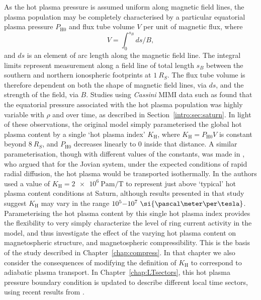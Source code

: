 As the hot plasma pressure is assumed uniform along magnetic field lines, the plasma population may be completely characterised by a particular equatorial plasma pressure $P_\mathrm{H0}$ and flux tube volume $V$ per unit of magnetic flux, where
\begin{equation}\label{intro:eq:ftv}
V = \int_{0}^{s_{B}} ds/B,
\end{equation}
and $ds$ is an element of arc length along the magnetic field line. The integral limits represent measurement along a field line of total length $s_B$ between the southern and northern ionospheric footprints at $\SI{1}{R_S}$. The flux tube volume is therefore dependent on both the shape of magnetic field lines, via $ds$, and the strength of the field, via $B$. Studies using \textit{Cassini} MIMI data such as \citet{sergis2007} found that the equatorial pressure associated with the hot plasma population was highly variable with $\rho$ and over time, as described in Section~\ref{intro:sec:saturn}. In light of these observations, the original \citet{achilleos2010a} model simply parameterised the global hot plasma content by a single `hot plasma index' $K_\mathrm{H}$, where $ K_\mathrm{H}= P_\mathrm{H0}V$ is constant beyond $\SI{8}{R_S}$, and $P_\mathrm{H0}$ decreases linearly to 0 inside that distance. A similar parameterisation, though with different values of the constants, was made in \citet{caudal1986}, who argued that for the Jovian system, under the expected conditions of rapid radial diffusion, the hot plasma would be transported isothermally. In \citet{achilleos2010a} the authors used a value of $K_\mathrm{H} = \SI{2e6}{\pascal\meter\per\tesla}$ to represent just above `typical' hot plasma content conditions at Saturn, although results presented in that study suggest $K_\mathrm{H}$ may vary in the range $10^5{\--}10^7~\si{\pascal\meter\per\tesla}$. Parameterising the hot plasma content by this single hot plasma index provides the flexibility to very simply characterize the level of ring current activity in the model, and thus investigate the effect of the varying hot plasma content on magnetospheric structure, and magnetospheric compressibility. This is the basis of the study described in Chapter~\ref{chap:compress}. In that chapter we also consider the consequences of modifying the definition of $K_\mathrm{H}$ to correspond to adiabatic plasma transport. In Chapter~\ref{chap:LTsectors}, this hot plasma pressure boundary condition is updated to describe different local time sectors, using recent results from \citet{sergis2017}.

